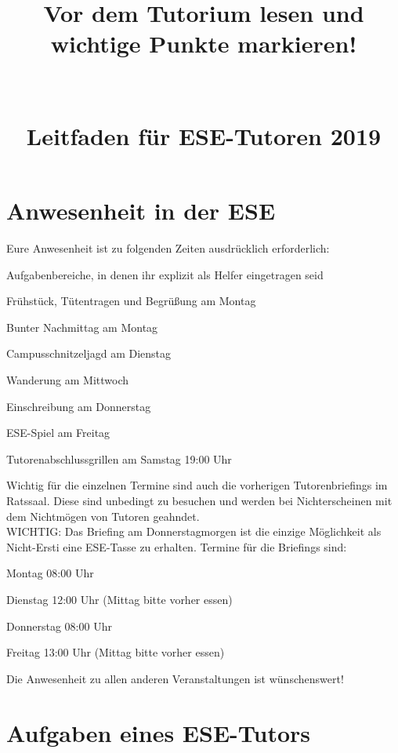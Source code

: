 \documentclass[a4paper,12pt]{report}
\begin{document}
\title{\huge{\textbf{Vor dem Tutorium lesen und wichtige Punkte markieren!}}\\\ \\\ \\{Leitfaden für ESE-Tutoren 2019}}
\date{}
\author{}
\maketitle

\section*{Anwesenheit in der ESE}
Eure Anwesenheit ist zu folgenden Zeiten ausdrücklich erforderlich:
\begin{itemize*}
	\item Aufgabenbereiche, in denen ihr explizit als Helfer eingetragen seid
	\item Frühstück, Tütentragen und Begrüßung am Montag
	\item Bunter Nachmittag am Montag
	\item Campusschnitzeljagd am Dienstag
	\item Wanderung am Mittwoch
	\item Einschreibung am Donnerstag
	\item ESE-Spiel am Freitag
	\item Tutorenabschlussgrillen am Samstag 19:00 Uhr %
\end{itemize*}
Wichtig für die einzelnen Termine sind auch die vorherigen Tutorenbriefings im Ratssaal. Diese sind unbedingt zu besuchen und werden bei Nichterscheinen mit dem Nichtmögen von Tutoren geahndet.\\
WICHTIG: Das Briefing am Donnerstagmorgen ist die einzige Möglichkeit als Nicht-Ersti eine ESE-Tasse zu erhalten.
Termine für die Briefings sind:
\begin{itemize*}
	\item Montag   		08:00 Uhr
	\item Dienstag 		12:00 Uhr (Mittag bitte vorher essen)
	\item Donnerstag	08:00 Uhr
	\item Freitag		13:00 Uhr (Mittag bitte vorher essen)
\end{itemize*}

Die Anwesenheit zu allen anderen Veranstaltungen ist wünschenswert!

\section*{Aufgaben eines ESE-Tutors}
\end{document}

